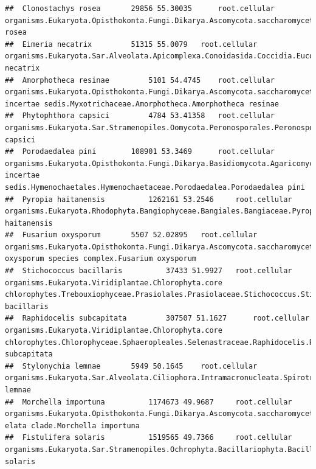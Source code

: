 \documentclass{article}\usepackage[]{graphicx}\usepackage[]{color}
\makeatletter
\newenvironment{kframe}{%
 \def\at@end@of@kframe{}%
 \ifinner\ifhmode%
  \def\at@end@of@kframe{\end{minipage}}%
  \begin{minipage}{\columnwidth}%
 \fi\fi%
 \def\FrameCommand##1{\hskip\@totalleftmargin \hskip-\fboxsep
 \colorbox{shadecolor}{##1}\hskip-\fboxsep
     \hskip-\linewidth \hskip-\@totalleftmargin \hskip\columnwidth}%
 \MakeFramed {\advance\hsize-\width
   \@totalleftmargin\z@ \linewidth\hsize
   \@setminipage}}%
 {\par\unskip\endMakeFramed%
 \at@end@of@kframe}
\newenvironment{knitrout}{}{} %
\makeatother
\begin{document}
\begin{knitrout}
\begin{kframe}
\begin{verbatim}
##  Clonostachys rosea 		 29856 55.30035 	 root.cellular organisms.Eukaryota.Opisthokonta.Fungi.Dikarya.Ascomycota.saccharomyceta.Pezizomycotina.leotiomyceta.sordariomyceta.Sordariomycetes.Hypocreomycetidae.Hypocreales.Bionectriaceae.Clonostachys.Clonostachys rosea
##  Eimeria necatrix 		 51315 55.0079 	 root.cellular organisms.Eukaryota.Sar.Alveolata.Apicomplexa.Conoidasida.Coccidia.Eucoccidiorida.Eimeriorina.Eimeriidae.Eimeria.Eimeria necatrix
##  Amorphotheca resinae 		 5101 54.4745 	 root.cellular organisms.Eukaryota.Opisthokonta.Fungi.Dikarya.Ascomycota.saccharomyceta.Pezizomycotina.leotiomyceta.sordariomyceta.Leotiomycetes.Leotiomycetes incertae sedis.Myxotrichaceae.Amorphotheca.Amorphotheca resinae
##  Phytophthora capsici 		 4784 53.41358 	 root.cellular organisms.Eukaryota.Sar.Stramenopiles.Oomycota.Peronosporales.Peronosporaceae.Phytophthora.Phytophthora capsici
##  Porodaedalea pini 		 108901 53.3469 	 root.cellular organisms.Eukaryota.Opisthokonta.Fungi.Dikarya.Basidiomycota.Agaricomycotina.Agaricomycetes.Agaricomycetes incertae sedis.Hymenochaetales.Hymenochaetaceae.Porodaedalea.Porodaedalea pini
##  Pyropia haitanensis 		 1262161 53.2546 	 root.cellular organisms.Eukaryota.Rhodophyta.Bangiophyceae.Bangiales.Bangiaceae.Pyropia.Pyropia haitanensis
##  Fusarium oxysporum 		 5507 52.02895 	 root.cellular organisms.Eukaryota.Opisthokonta.Fungi.Dikarya.Ascomycota.saccharomyceta.Pezizomycotina.leotiomyceta.sordariomyceta.Sordariomycetes.Hypocreomycetidae.Hypocreales.Nectriaceae.Fusarium.Fusarium oxysporum species complex.Fusarium oxysporum
##  Stichococcus bacillaris 		 37433 51.9927 	 root.cellular organisms.Eukaryota.Viridiplantae.Chlorophyta.core chlorophytes.Trebouxiophyceae.Prasiolales.Prasiolaceae.Stichococcus.Stichococcus bacillaris
##  Raphidocelis subcapitata 		 307507 51.1627 	 root.cellular organisms.Eukaryota.Viridiplantae.Chlorophyta.core chlorophytes.Chlorophyceae.Sphaeropleales.Selenastraceae.Raphidocelis.Raphidocelis subcapitata
##  Stylonychia lemnae 		 5949 50.1645 	 root.cellular organisms.Eukaryota.Sar.Alveolata.Ciliophora.Intramacronucleata.Spirotrichea.Stichotrichia.NA.Oxytrichidae.Stylonychinae.Stylonychia.Stylonychia lemnae
##  Morchella importuna 		 1174673 49.9687 	 root.cellular organisms.Eukaryota.Opisthokonta.Fungi.Dikarya.Ascomycota.saccharomyceta.Pezizomycotina.Pezizomycetes.Pezizales.Morchellaceae.Morchella.Morchella elata clade.Morchella importuna
##  Fistulifera solaris 		 1519565 49.7366 	 root.cellular organisms.Eukaryota.Sar.Stramenopiles.Ochrophyta.Bacillariophyta.Bacillariophyceae.Bacillariophycidae.Naviculales.Naviculaceae.Fistulifera.Fistulifera solaris

\end{verbatim}
\end{kframe}
\end{knitrout}
\end{document}
